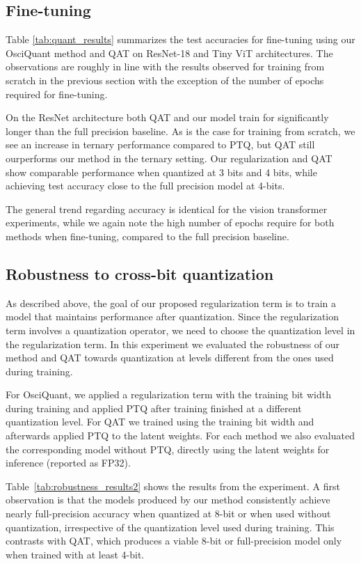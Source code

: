 \subsection{Fine-tuning}
Table \ref{tab:quant_results} summarizes the test accuracies for fine-tuning using our OsciQuant method and QAT on ResNet-18 and Tiny ViT architectures. The observations are roughly in line with the results observed for training from scratch in the previous section with the exception of the number of epochs required for fine-tuning.

On the ResNet architecture both QAT and our model train for significantly longer than the full precision baseline. As is the case for training from scratch, we see an increase in ternary performance compared to PTQ, but QAT still ourperforms our method in the ternary setting. Our regularization and QAT show comparable performance when quantized at 3 bits and 4 bits, while achieving test accuracy close to the full precision model at 4-bits.

The general trend regarding accuracy is identical for the vision transformer experiments, while we again note the high number of epochs require for both methods when fine-tuning, compared to the full precision baseline.


\subsection{Robustness to cross-bit quantization}

As described above, the goal of our proposed regularization term is to train a model that maintains performance after quantization. Since the regularization term involves a quantization operator, we need to choose the quantization level in the regularization term. In this experiment we evaluated the robustness of our method and QAT towards quantization at levels different from the ones used during training. 

For OsciQuant, we applied a regularization term with the training bit width during training and applied PTQ after training finished at a different quantization level. For QAT we trained using the training bit width and afterwards applied PTQ to the latent weights. For each method we also evaluated the corresponding model without PTQ, directly using the latent weights for inference (reported as FP32).

Table~\ref{tab:robustness_results2} shows the results from the experiment. A first observation is that the models produced by our method consistently achieve nearly full-precision accuracy when quantized at 8-bit or when used without quantization, irrespective of the quantization level used during training. This contrasts with QAT, which produces a viable 8-bit or full-precision model only when trained with at least 4-bit.

